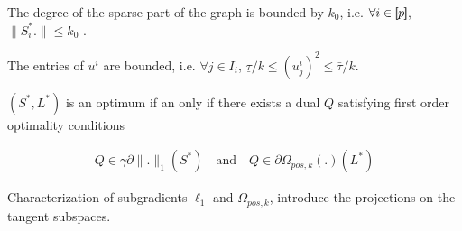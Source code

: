\documentclass[letterpaper]{article}
\begin{document}
\begin{assumption}The degree of the sparse part of the graph is bounded by $k_0$, i.e. $\forall i\in[\!\![p]\!\!]$,  $\|S^*_i.\|\leq k_0$ .
\end{assumption}

\begin{assumption}The entries of $u^i$ are bounded, i.e. $\forall j\in I_i$,  $\underline{\tau} / k \leq (u_j^i)^2 \leq \bar{\tau} / k$.
\end{assumption}

$(S^*, L^*)$ is an optimum if an only if there exists a dual $Q$ satisfying first order optimality conditions

\begin{align*}
Q\in \gamma \partial \|.\|_1(S^*) \quad \text{and} \quad Q\in \partial \Omega_{pos,k}(.)(L^*)
\end{align*}

Characterization of subgradients $\ell_1$ and $\Omega_{pos,k}$, introduce the projections on the tangent subspaces.
\end{document}
